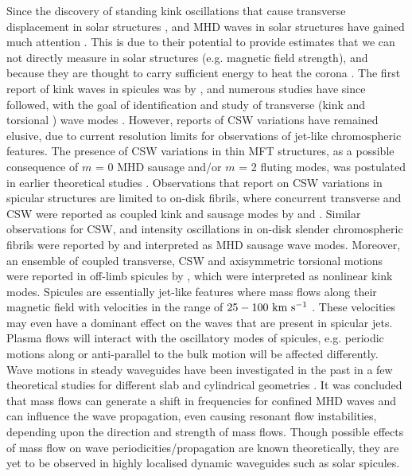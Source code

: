 Since the discovery of standing kink oscillations that cause transverse displacement in solar structures \citep{Aschwanden1999ApJ520880A, Nakariakov1999Sci285862N, Aschwanden2002SoPh20699A}, and MHD waves in solar structures have gained much attention \citep{Cally1985AuJPh38825C, Kudoh1999ApJ514493K, Fujimura2009ApJ7021443F, Zaqarashvili_2009SSRv, Kuridze2012, Jess2012ApJ744L5J, Mooroogen2017AA607A46M, Allcock2019FrASS648A}. This is due to their potential to provide estimates that we can not directly measure in solar structures (e.g. magnetic field strength), and because they are thought to carry sufficient energy to heat the corona \citep{Alfv1947MNRAS107211A, Gordon1983ApJ266373G, Poedts2002ESASP505273P, Srivastava2017NatSR743147S}. The first report of kink waves in spicules was by \cite{Kukhianidze2006AA}, and numerous studies have since followed, with the goal of identification and study of transverse (kink and torsional \Alfven) wave modes \citep{De_Pontieu2007, Ebadi2014ApSS35331E, Pascoe2016AA585L6P, Sharma2017, Tiwari2019ApJ876106T}. However, reports of CSW variations have remained elusive, due to current resolution limits for observations of jet-like chromospheric features. The presence of CSW variations in thin MFT structures, as a possible consequence of $m$ = 0 MHD sausage and/or $m$ = 2 fluting modes, was postulated in earlier theoretical studies \citep{Ziegler1997a, Ziegler1997, Ruderman2010}. Observations that report on CSW variations in spicular structures are limited to on-disk fibrils, where concurrent transverse and CSW were reported as coupled kink and sausage modes by \cite{Jess2012ApJ744L5J} and \cite{Morton2012}. Similar observations for CSW, and intensity oscillations in on-disk slender chromospheric fibrils were reported by \citet{Gafeira2017ApJS2297G} and interpreted as MHD sausage wave modes. Moreover, an ensemble of coupled transverse, CSW and axisymmetric torsional motions were reported in off-limb spicules by \citet{Sharma2018ApJ85361S}, which were interpreted as nonlinear kink modes. \np
Spicules are essentially jet-like features where mass flows along their magnetic field with velocities in the range of $25-100~\rm{km ~s^{-1}}$  \citep{Beckers1972ARA&A, Sterling_2000SoPh, Pereira2012}. These velocities may even have a dominant effect on the waves that are present in spicular jets. Plasma flows will interact with the oscillatory modes of spicules, e.g. periodic motions along or anti-parallel to the bulk motion will be affected differently. Wave motions in steady waveguides have been investigated in the past in a few theoretical studies for different slab and cylindrical geometries \citep{Narayanan1991,nakariakov1995, terrahomem2003, soler2008}. It was concluded that mass flows can generate a shift in frequencies for confined MHD waves and can influence the wave propagation, even causing resonant flow instabilities, depending upon the direction and strength of mass flows. Though possible effects of mass flow on wave periodicities/propagation are known theoretically, they are yet to be observed in highly localised dynamic waveguides such as solar spicules. \np
